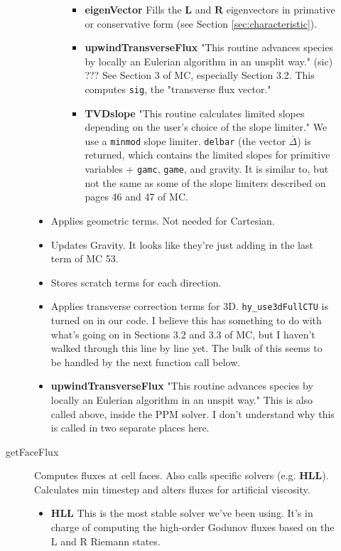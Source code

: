 \documentclass[preprint,11pt]{aastex}
\begin{document}
\begin{description}
\begin{description}
\begin{itemize}
\begin{itemize}
\begin{itemize}
					\item \textbf{eigenVector} Fills the $\mathbf{L}$ and $\mathbf{R}$ eigenvectors in primative or conservative form (see Section \ref{sec:characteristic}). 
					\item \textbf{upwindTransverseFlux} "This routine advances species by locally an Eulerian algorithm in an unsplit way." (sic)  ???  See Section 3 of MC, especially Section 3.2.  This computes \verb!sig!, the "transverse flux vector."
					\item \textbf{TVDslope} "This routine calculates limited slopes depending on the user's choice of the slope limiter."  We use a \verb!minmod! slope limiter.  \verb!delbar! (the vector $\bar{\Delta}$) is returned, which contains the limited slopes for primitive variables + \verb!gamc!, \verb!game!, and gravity.  It is similar to, but not the same as some of the slope limiters described on pages 46 and 47 of MC.
				\end{itemize}
			\end{itemize}
			\item Applies geometric terms.  Not needed for Cartesian.
			\item Updates Gravity.  It looks like they're just adding in the last term of MC 53.
			\item Stores scratch terms for each direction.
			\item Applies transverse correction terms for 3D.  \verb!hy_use3dFullCTU! is turned on in our code.  I believe this has something to do with what's going on in Sections 3.2 and 3.3 of MC, but I haven't walked through this line by line yet.  The bulk of this seems to be handled by the next function call below.
			\item \textbf{upwindTransverseFlux} "This routine advances species by locally an Eulerian algorithm in an unspit way."  This is also called above, inside the PPM solver.  I don't understand why this is called in two separate places here.
		\end{itemize}
		\item[getFaceFlux] Computes fluxes at cell faces.  Also calls specific solvers (e.g. \textbf{HLL}).  Calculates min timestep and alters fluxes for artificial viscosity.
		\begin{itemize}
			\item \textbf{HLL} This is the most stable solver we've been using.  It's in charge of computing the high-order Godunov fluxes based on the L and R Riemann states.
			\begin{enumerate}

\end{enumerate}
\end{itemize}
\end{description}
\end{description}
\end{document}
